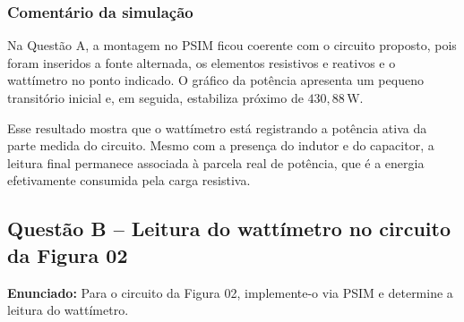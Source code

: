 \documentclass[12pt,a4paper]{article}
\begin{document}
\subsubsection*{Comentário da simulação}

Na Questão A, a montagem no PSIM ficou coerente com o circuito proposto, pois foram inseridos a fonte alternada, os elementos resistivos e reativos e o wattímetro no ponto indicado. O gráfico da potência apresenta um pequeno transitório inicial e, em seguida, estabiliza próximo de $430{,}88\,\mathrm{W}$.

Esse resultado mostra que o wattímetro está registrando a potência ativa da parte medida do circuito. Mesmo com a presença do indutor e do capacitor, a leitura final permanece associada à parcela real de potência, que é a energia efetivamente consumida pela carga resistiva.

\vspace{0.5cm}

\newpage
\subsection*{Questão B -- Leitura do wattímetro no circuito da Figura 02}

\textbf{Enunciado:} Para o circuito da Figura 02, implemente-o via PSIM e determine a leitura do wattímetro.

\vspace{0.5cm}
\end{document}
